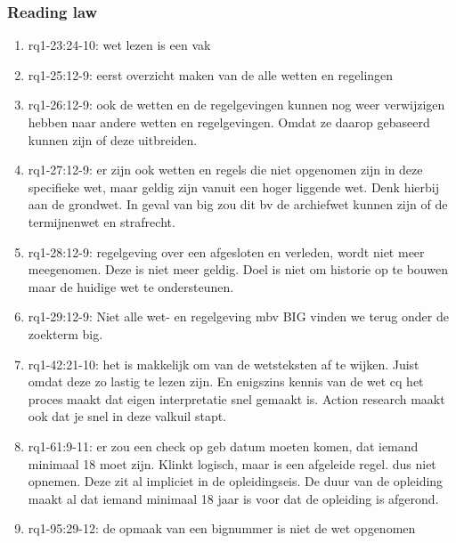 \subsubsection{Reading law}
\begin{comment}
Hoort dit niet bij rq3?
plaats hier de afgehandelde items.
\end{comment}
\begin{enumerate}
    \item rq1-23:24-10: wet lezen is een vak 
    \item rq1-25:12-9: eerst overzicht maken van de alle wetten en regelingen
    \item rq1-26:12-9: ook de wetten en de regelgevingen kunnen nog weer verwijzigen hebben naar andere wetten en regelgevingen. Omdat ze daarop gebaseerd kunnen zijn of deze uitbreiden.
    \item rq1-27:12-9: er zijn ook wetten en regels die niet opgenomen zijn in deze specifieke wet, maar geldig zijn vanuit een hoger liggende wet. 
    Denk hierbij aan de grondwet. 
    In geval van big zou dit bv de archiefwet kunnen zijn of de termijnenwet en strafrecht.
    \item rq1-28:12-9: regelgeving over een afgesloten en verleden, wordt niet meer meegenomen. 
    Deze is niet meer geldig. 
    Doel is niet om historie op te bouwen maar de huidige wet te ondersteunen.
    \item rq1-29:12-9: Niet alle wet- en regelgeving mbv BIG vinden we terug onder de zoekterm big.
    \item rq1-42:21-10: het is makkelijk om van de wetsteksten af te wijken. Juist omdat deze zo lastig te lezen zijn. En enigszins kennis van de wet cq het proces maakt dat eigen interpretatie snel gemaakt is. Action research maakt ook dat je snel in deze valkuil stapt.
    \item rq1-61:9-11: er zou een check op geb datum moeten komen, dat iemand minimaal 18 moet zijn. Klinkt logisch, maar is een afgeleide regel. dus niet opnemen. Deze zit al impliciet in de opleidingseis. De duur van de opleiding maakt al dat iemand minimaal 18 jaar is voor dat de opleiding is afgerond.
    \item rq1-95:29-12: de opmaak van een bignummer is niet de wet opgenomen
\end{enumerate}

